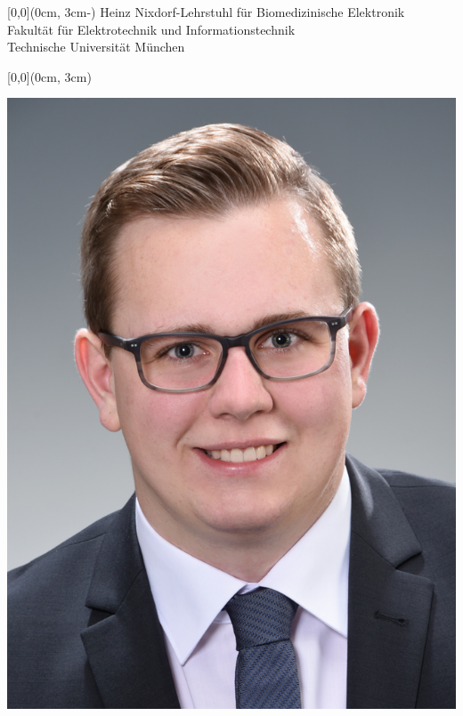 \begin{textblock*}{\textwidth}[0,0](0cm, 3cm-\SeitenrandOben)%
	\textcolor{TUMblau}{Heinz Nixdorf-Lehrstuhl für Biomedizinische Elektronik\\
	Fakultät für Elektrotechnik und Informationstechnik\\
	Technische Universität München}
\end{textblock*}
	
	
\begin{textblock*}{\textwidth}[0,0](0cm, 3cm)%
	{\fontsize{24pt}{26pt}\selectfont\textbf{\Titel}}
	
		
	\vspace*{14pt}
	\begin{center}
	\includegraphics[clip,height=\FotoStudentHoehe, keepaspectratio] 
	{./Ressources/FotoStudent.jpg}
	\end{center}
		
\end{textblock*}	
	
